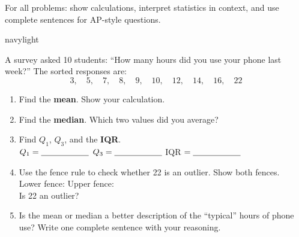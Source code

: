 \documentclass[10pt]{article}
\begin{document}
\namedateperiod

\vspace{0.10in}

\begin{tcolorbox}[colback=sky, colframe=navy, boxrule=0.8pt, arc=2mm,
    left=3mm, right=3mm, top=1.5mm, bottom=1.5mm]
\small For all problems: show calculations, interpret statistics in context,
and use complete sentences for AP-style questions.
\end{tcolorbox}

\vspace{0.12in}

\begin{blurbbox}{navylight}
\small

A survey asked 10 students: ``How many hours did you use your phone last week?''
The sorted responses are:
\[3,\quad 5,\quad 7,\quad 8,\quad 9,\quad 10,\quad 12,\quad 14,\quad 16,\quad 22\]

\vspace{0.10in}

\begin{enumerate}[leftmargin=1.5em, itemsep=8pt]

  \item Find the \textbf{mean}. Show your calculation.\\[5pt]
        \writeline

  \item Find the \textbf{median}. Which two values did you average?\\[5pt]
        \writeline

  \item Find $Q_1$, $Q_3$, and the \textbf{IQR}.\\[5pt]
        $Q_1 = \blank{2cm}$ \quad $Q_3 = \blank{2cm}$ \quad IQR $= \blank{2cm}$

  \item Use the fence rule to check whether 22 is an outlier. Show both fences.\\[5pt]
        Lower fence: \blank{5cm} \quad Upper fence: \blank{5cm}\\[4pt]
        Is 22 an outlier? \blank{3cm}

  \item Is the mean or median a better description of the ``typical'' hours of
        phone use? Write one complete sentence with your reasoning.\\[5pt]
        \writeline\\[1pt]\writeline

\end{enumerate}

\end{blurbbox}
\end{document}
